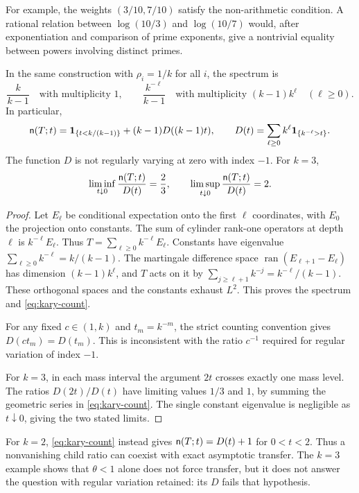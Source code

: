 For example, the weights $(3/10,7/10)$ satisfy the non-arithmetic
condition. A rational relation between $\log(10/3)$ and $\log(10/7)$
would, after exponentiation and comparison of prime exponents, give a
nontrivial equality between powers involving distinct primes.

\begin{proposition}\label{prop:kary}
In the same construction with $\rho_i=1/k$ for all $i$, the spectrum is
\[
 \frac{k}{k-1}\quad\text{with multiplicity }1,\qquad
 \frac{k^{-\ell}}{k-1}\quad\text{with multiplicity }(k-1)k^\ell
 \quad(\ell\ge0).
\]
In particular,
\begin{equation}\label{eq:kary-count}
 \mathsf n(T;t)=\mathbf 1_{\{t<k/(k-1)\}}+(k-1)D((k-1)t),
 \qquad
 D(t)=\sum_{\ell\ge0}k^\ell\mathbf 1_{\{k^{-\ell}>t\}}.
\end{equation}
The function $D$ is not regularly varying at zero with index $-1$.
For $k=3$,
\[
 \liminf_{t\downarrow0}\frac{\mathsf n(T;t)}{D(t)}=\frac23,\qquad
 \limsup_{t\downarrow0}\frac{\mathsf n(T;t)}{D(t)}=2.
\]
\end{proposition}
\begin{proof}
Let $E_\ell$ be conditional expectation onto the first $\ell$ coordinates,
with $E_0$ the projection onto constants. The sum of cylinder rank-one
operators at depth $\ell$ is $k^{-\ell}E_\ell$. Thus
$T=\sum_{\ell\ge0}k^{-\ell}E_\ell$.
Constants have eigenvalue $\sum_{\ell\ge0}k^{-\ell}=k/(k-1)$.
The martingale difference space
$\operatorname{ran}(E_{\ell+1}-E_\ell)$ has dimension $(k-1)k^\ell$,
and $T$ acts on it by
$\sum_{j\ge\ell+1}k^{-j}=k^{-\ell}/(k-1)$.
These orthogonal spaces and the constants exhaust $L^2$.
This proves the spectrum and \eqref{eq:kary-count}.

For any fixed $c\in(1,k)$ and $t_m=k^{-m}$, the strict counting
convention gives $D(ct_m)=D(t_m)$. This is inconsistent with the ratio
$c^{-1}$ required for regular variation of index $-1$.

For $k=3$, in each mass interval the argument $2t$ crosses exactly one
mass level. The ratios $D(2t)/D(t)$ have limiting values $1/3$ and $1$,
by summing the geometric series in \eqref{eq:kary-count}.
The single constant eigenvalue is negligible as $t\downarrow0$,
giving the two stated limits.
\end{proof}

\begin{remark}
For $k=2$, \eqref{eq:kary-count} instead gives
$\mathsf n(T;t)=D(t)+1$ for $0<t<2$.
Thus a nonvanishing child ratio can coexist with exact asymptotic transfer.
The $k=3$ example shows that $\theta<1$ alone does not force transfer,
but it does not answer the question with regular variation retained:
its $D$ fails that hypothesis.
\end{remark}

